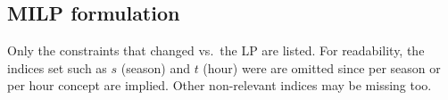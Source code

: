 




\newpage
\subsection{MILP formulation}
\label{ssec:MILP_implementation}

Only the constraints that changed vs.\ the LP are listed. For readability, the indices set such as $s$ (season) and $t$ 
(hour) were are omitted since per season or per hour concept are implied. Other non-relevant indices may be missing too.

